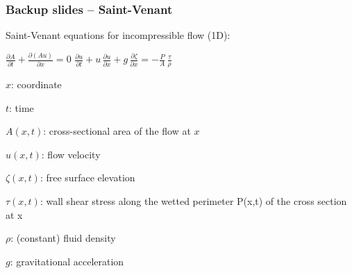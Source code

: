 \begin{frame}
    \frametitle{Backup slides -- Saint-Venant}
\vspace*{0.8cm}

Saint-Venant equations for incompressible flow (1D):

${\frac {\partial A}{\partial t}}+{\frac {\partial \left(Au\right)}{\partial x}}=0$\newline
${\frac {\partial u}{\partial t}}+u\,{\frac {\partial u}{\partial x}}+g\,{\frac {\partial \zeta }{\partial x}}=-{\frac {P}{A}}\,{\frac {\tau }{\rho }}$\newline

\begin{PraesentationAufzaehlung}
\item $x$: coordinate
\item $t$: time
\item $A(x,t)$: cross-sectional area of the flow at $x$
\item $u(x,t)$: flow velocity
\item $\zeta (x,t)$: free surface elevation
\item $\tau (x,t)$: wall shear stress along the wetted perimeter P(x,t) of the cross section at x
\item $\rho$: (constant) fluid density
\item $g$: gravitational acceleration
\end{PraesentationAufzaehlung}

\end{frame}
\clearpage